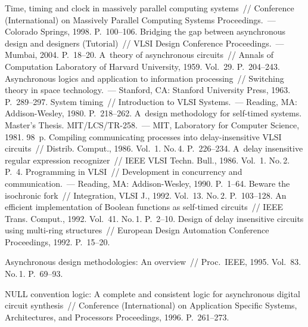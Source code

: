 \begin{multicols}{2}
{\small\frenchspacing
{%
\begin{thebibliography}{99}
 Time, timing and clock in massively parallel computing systems~// Conference  
(International) on Massively Parallel Computing Systems Proceedings.~--- Colorado Springs, 
1998. P.~100--106.
 Bridging the gap between asynchronous design and 
designers (Tutorial)~// VLSI Design Conference Proceedings.~--- Mumbai, 2004. P.~18--20.
 A~theory of asynchronous circuits~// Annals of Computation 
Laboratory of Harvard University, 1959. Vol.~29. P.~204--243.
 Asynchronous logics and application to information processing~// Switching 
theory in space technology.~--- Stanford, CA: Stanford University Press, 1963. P.~289--297.
 System timing~// Introduction to VLSI Systems.~--- Reading, MA: 
Addison-Wesley, 1980. P.~218--262.
 A~design methodology for self-timed systems. Master's Thesis. 
MIT/LCS/TR-258.~--- MIT, Laboratory for Computer Science, 1981. 98~p.
 Compiling communicating processes into delay-insensitive VLSI circuits~// 
Distrib. Comput., 1986. Vol.~1. No.\,4. P.~226--234.
 A~delay insensitive regular expression recognizer~// IEEE VLSI Techn. 
Bull., 1986. Vol.~1. No.\,2. P.~4.
 Programming in VLSI~// Development in concurrency and communication.~--- 
Reading, MA: Addison-Wesley, 1990. P.~1--64.
 Beware the isochronic fork~// Integration, VLSI J., 1992. Vol.~13. No.\,2. 
P.~103--128.
 An efficient implementation of Boolean functions as 
self-timed circuits~// IEEE Trans. Comput., 1992. Vol.~41. No.\,1. P.~2--10.
 Design of delay insensitive circuits using 
multi-ring structures~// European Design Automation Conference Proceedings, 1992. 
P.~15--20.

 Asynchronous design methodologies: An overview~//  Proc.\ IEEE, 1995. 
Vol.~83. No.\,1. P.~69--93.

 NULL convention logic: A complete and consistent logic for 
asynchronous digital circuit synthesis~// Conference (International) on Application Specific 
Systems, Architectures, and Processors Proceedings, 1996. P.~261--273.



\end{thebibliography}}}
\end{multicols}
